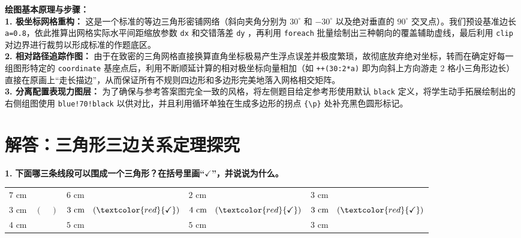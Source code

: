 {\small\color{blue!70!black}
\textbf{绘图基本原理与步骤：}\\
\textbf{1. 极坐标网格重构：} 这是一个标准的等边三角形密铺网络（斜向夹角分别为 $30^\circ$ 和 $-30^\circ$ 以及绝对垂直的 $90^\circ$ 交叉点）。我们预设基准边长 \texttt{a=0.8}，依此推算出网格实际水平间距缩放参数 \texttt{dx} 和交错落差 \texttt{dy} ，再利用 \texttt{foreach} 批量绘制出三种朝向的覆盖辅助虚线，最后利用 \texttt{clip} 对边界进行裁剪以形成标准的作题底区。\\
\textbf{2. 相对路径追踪作图：} 由于在致密的三角网格直接换算直角坐标极易产生浮点误差并极度繁琐，故彻底放弃绝对坐标，转而在确定好每一组图形特定的 \texttt{coordinate} 基座点后，利用不断顺延计算的相对极坐标向量相加（如 \texttt{++(30:2*a)} 即为向斜上方向游走 2 格小三角形边长）直接在原画上“走长描边”，从而保证所有不规则四边形和多边形完美地落入网格相交矩阵。\\
\textbf{3. 分离配置表现力图层：} 为了确保与参考答案图完全一致的风格，将左侧题目给定参考形使用默认 \texttt{black} 定义，将学生动手拓展绘制出的右侧组图使用 \texttt{blue!70!black} 以供对比，并且利用循环单独在生成多边形的拐点 \texttt{\{\textbackslash{}p\}} }处补充黑色圆形标记。%
\newpage



\newpage

\section{解答：三角形三边关系定理探究}

\vspace{0.6cm}

\textbf{\LARGE 1.} \textbf{下面哪三条线段可以围成一个三角形？在括号里画“$\checkmark$”，并说说为什么。}

\vspace{0.4cm}

\begin{center}
\renewcommand{\arraystretch}{1.5}
\setlength{\tabcolsep}{15pt}
\begin{tabular}{llll}
$7\text{ cm}$ & $6\text{ cm}$ & $2\text{ cm}$ & $3\text{ cm}$ \\
$3\text{ cm} \quad (\quad)$ & $3\text{ cm} \quad (\textcolor{red}{\checkmark})$ & $4\text{ cm} \quad (\textcolor{red}{\checkmark})$ & $3\text{ cm} \quad (\textcolor{red}{\checkmark})$ \\
$4\text{ cm}$ & $5\text{ cm}$ & $5\text{ cm}$ & $3\text{ cm}$ \\
\end{tabular}
\end{center}

